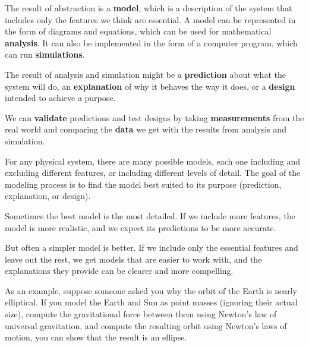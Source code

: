 \documentclass[12pt]{book}
\theoremstyle{exercise}
\begin{document}

The result of abstraction is a {\bf model}, which is a description of the system that includes only the features we think are essential.  A model can be represented in the form of diagrams and equations, which can be used for mathematical {\bf analysis}.  It can also be implemented in the form of a computer program, which can run {\bf simulations}.


The result of analysis and simulation might be a {\bf prediction} about what the system will do, an {\bf explanation} of why it behaves the way it does, or a {\bf design} intended to achieve a purpose.


We can {\bf validate} predictions and test designs by taking {\bf measurements} from the real world and comparing the {\bf data} we get with the results from analysis and simulation. 


For any physical system, there are many possible models, each one including and excluding different features, or including different levels of detail.  The goal of the modeling process is to find the model best suited to its purpose (prediction, explanation, or design).


Sometimes the best model is the most detailed.  If we include more features, the model is more realistic, and we expect its predictions to be more accurate.


But often a simpler model is better.  If we include only the essential features and leave out the rest, we get models that are easier to work with, and the explanations they provide can be clearer and more compelling.


As an example, suppose someone asked you why the orbit of the Earth is nearly elliptical.  If you model the Earth and Sun as point masses (ignoring their actual size), compute the gravitational force between them using Newton's law of universal gravitation, and compute the resulting orbit using Newton's laws of motion, you can show that the result is an ellipse.

\end{document}
